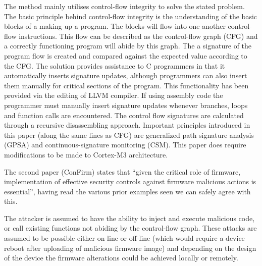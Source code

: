 The method mainly utilises control-flow integrity to solve the stated problem. The basic principle behind control-flow integrity is the understanding of the basic blocks of a making up a program. The blocks will flow into one another control-flow instructions. This flow can be described as the control-flow graph (CFG) and a correctly functioning program will abide by this graph. The a signature of the program flow is created and compared against the expected value according to the CFG. The solution provides assistance to C programmers in that it automatically inserts signature updates, although programmers can also insert them manually for critical sections of the program. This functionality has been provided via the editing of LLVM compiler. If using assembly code the programmer must manually insert signature updates whenever branches, loops and function calls are encountered. The control flow signatures are calculated through a  recursive disassembling approach.  Important principles introduced in this paper (along the same lines as CFG) are generalized path signature analysis (GPSA) and continuous-signature monitoring (CSM).  This paper does require modifications to be made to Cortex-M3 architecture.



The second paper \cite{Wang2016} (ConFirm) states that ``given the critical role of firmware, implementation of effective security controls against firmware malicious actions is essential'', having read the various prior examples seen we can safely agree with this. 

The attacker is assumed to have the ability to inject and execute malicious code, or call existing functions not abiding by the control-flow graph. These attacks are assumed to be possible either on-line or off-line (which would require a device reboot after uploading of malicious firmware image) and depending on the design of the device the firmware alterations could be achieved locally or remotely.

